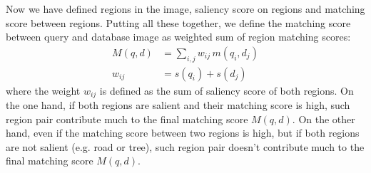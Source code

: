 Now we have defined regions in the image, saliency score on regions and matching score between regions. 
Putting all these together, we define the matching score between query and database image as weighted sum of region matching scores:
\small
\begin{align}
\label{eq:img_match}
M(q, d) &= \sum_{i, j} w_{ij}\, m(q_i, d_j)\\
\label{eq:weight}
w_{ij} &= s(q_i) + s(d_j)
\end{align}
\normalsize
where the weight $w_{ij}$ is defined as the sum of saliency score of both regions. 
On the one hand, if both regions are salient and their matching score is high, such region pair contribute much to the final matching score $M(q, d)$. 
On the other hand, even if the matching score between two regions is high, but if both regions are not salient (e.g. road or tree), such region pair doesn't contribute much to the final matching score $M(q, d)$. 

